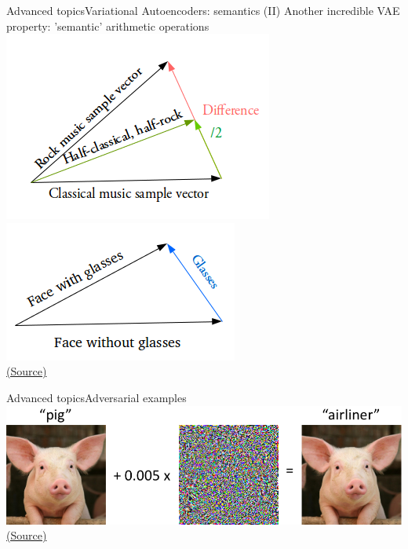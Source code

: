 \documentclass[10pt,compress]{beamer} %
\begin{document}
\begin{frame}{Advanced topics}{Variational Autoencoders: semantics (II)}
	Another incredible VAE property: 'semantic' arithmetic operations
	\centering\includegraphics[width=0.3\linewidth]{figs/vector-vae1.png}\quad
	\centering\includegraphics[width=0.3\linewidth]{figs/vector-vae2.png}\\
	\scriptsize\href{https://towardsdatascience.com/intuitively-understanding-variational-autoencoders-1bfe67eb5daf}{(Source)}
\end{frame}

\begin{frame}{Advanced topics}{Adversarial examples}
	\centering\includegraphics[width=0.7\linewidth]{figs/adversarial.png}\\
	\scriptsize\href{https://medium.com/attentive-ai/fooling-cnns-via-adversarial-examples-877a9e0ee84e}{(Source)}
\end{frame}
\end{document}

